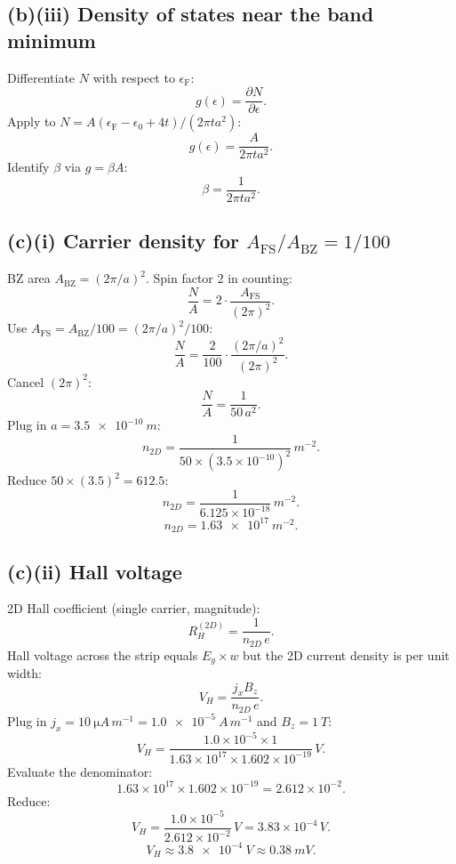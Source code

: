 \documentclass[11pt]{article}
\newcommand{\pd}[2]{\frac{\partial #1}{\partial #2}}
\newcommand{\eF}{\epsilon_{\mathrm{F}}}
\begin{document}
\subsection*{(b)(iii) Density of states near the band minimum}

Differentiate $N$ with respect to $\eF$:
\[
g(\epsilon) = \pd{N}{\epsilon}.
\]
Apply to $N = A(\eF-\epsilon_0+4t)/(2\pi ta^2)$:
\[
g(\epsilon) = \frac{A}{2\pi t a^2}.
\]
Identify $\beta$ via $g=\beta A$:
\begin{equation}
\boxed{\ \beta = \frac{1}{2\pi t a^2}.\ }
\label{eq:gbox}
\end{equation}

\subsection*{(c)(i) Carrier density for $A_{\mathrm{FS}}/A_{\mathrm{BZ}}=1/100$}

BZ area $A_{\mathrm{BZ}}=(2\pi/a)^2$. Spin factor 2 in counting:
\[
\frac{N}{A} = 2\cdot\frac{A_{\mathrm{FS}}}{(2\pi)^2}.
\]
Use $A_{\mathrm{FS}} = A_{\mathrm{BZ}}/100 = (2\pi/a)^2/100$:
\[
\frac{N}{A} = \frac{2}{100}\cdot\frac{(2\pi/a)^2}{(2\pi)^2}.
\]
Cancel $(2\pi)^2$:
\[
\frac{N}{A} = \frac{1}{50\,a^2}.
\]
Plug in $a=\SI{3.5e-10}{m}$:
\[
n_{2D} = \frac{1}{50\times(3.5\times 10^{-10})^2}\,\si{m^{-2}}.
\]
Reduce $50\times(3.5)^2 = 612.5$:
\[
n_{2D} = \frac{1}{6.125\times 10^{-18}}\,\si{m^{-2}}.
\]
\begin{equation}
\boxed{\ n_{2D} = \SI{1.63e17}{m^{-2}}.\ }
\label{eq:nbox}
\end{equation}

\subsection*{(c)(ii) Hall voltage}

2D Hall coefficient (single carrier, magnitude):
\[
R_H^{(2D)} = \frac{1}{n_{2D}\,e}.
\]
Hall voltage across the strip equals $E_y\times w$ but the 2D current density is per unit width:
\[
V_H = \frac{j_x B_z}{n_{2D}\,e}.
\]
Plug in $j_x = \SI{10}{\micro A\,m^{-1}} = \SI{1.0e-5}{A\,m^{-1}}$ and $B_z=\SI{1}{T}$:
\[
V_H = \frac{1.0\times 10^{-5}\times 1}{1.63\times 10^{17}\times 1.602\times 10^{-19}}\,\si{V}.
\]
Evaluate the denominator:
\[
1.63\times 10^{17}\times 1.602\times 10^{-19} = 2.612\times 10^{-2}.
\]
Reduce:
\[
V_H = \frac{1.0\times 10^{-5}}{2.612\times 10^{-2}}\,\si{V} = 3.83\times 10^{-4}\,\si{V}.
\]
\begin{equation}
\boxed{\ V_H \approx \SI{3.8e-4}{V} \approx \SI{0.38}{mV}.\ }
\label{eq:VHbox}
\end{equation}
\end{document}
